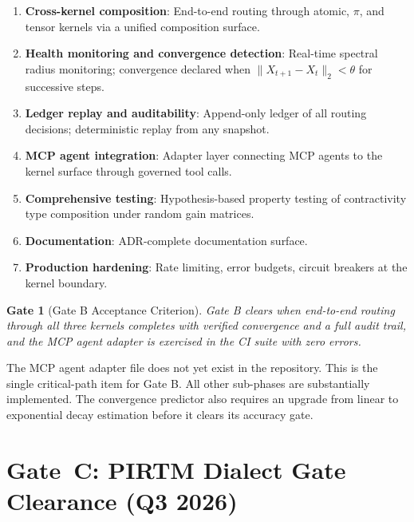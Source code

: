 \documentclass[11pt,letterpaper]{article}
\newtheorem{gatethm}[theorem]{Gate}
\theoremstyle{remark}
\begin{document}
\begin{enumerate}[leftmargin=2em,label=\textbf{SP\arabic*.}]
  \item \textbf{Cross-kernel composition}: End-to-end routing through
    atomic, $\pi$, and tensor kernels via a unified composition surface.
  \item \textbf{Health monitoring and convergence detection}: Real-time
    spectral radius monitoring; convergence declared when
    $\|X_{t+1} - X_t\|_2 < \theta$ for successive steps.
  \item \textbf{Ledger replay and auditability}: Append-only ledger
    of all routing decisions; deterministic replay from any snapshot.
  \item \textbf{MCP agent integration}: Adapter layer connecting MCP
    agents to the kernel surface through governed tool calls.
  \item \textbf{Comprehensive testing}: Hypothesis-based property testing
    of contractivity type composition under random gain matrices.
  \item \textbf{Documentation}: ADR-complete documentation surface.
  \item \textbf{Production hardening}: Rate limiting, error budgets,
    circuit breakers at the kernel boundary.
\end{enumerate}

\begin{gatethm}[Gate B Acceptance Criterion]
Gate B clears when end-to-end routing through all three kernels completes
with verified convergence and a full audit trail, and the MCP agent
adapter is exercised in the CI suite with zero errors.
\end{gatethm}

\begin{gapbox}
The MCP agent adapter file does not yet exist in the repository.
This is the single critical-path item for Gate B. All other sub-phases
are substantially implemented. The convergence predictor also requires
an upgrade from linear to exponential decay estimation before it clears
its accuracy gate.
\end{gapbox}

\section{Gate~C: PIRTM Dialect Gate Clearance (Q3 2026)}
\end{document}
